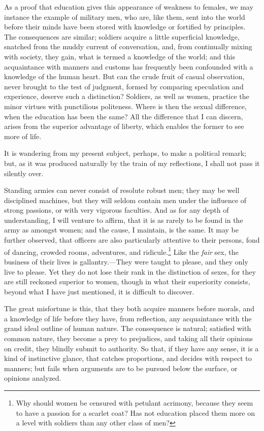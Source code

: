 As a proof that education gives this appearance of weakness to
females, we may instance the example of military men, who are, like
them, sent into the world before their minds have been stored with
knowledge or fortified by principles. The consequences are similar;
soldiers acquire a little superficial knowledge, snatched from the
muddy current of conversation, and, from continually mixing with
society, they gain, what is termed a knowledge of the world; and this
acquaintance with manners and customs has frequently been confounded
with a knowledge of the human heart. But can the crude fruit of casual
observation, never brought to the test of judgment, formed by
comparing speculation and experience, deserve such a distinction?
Soldiers, as well as women, practice the minor virtues with
punctilious politeness. Where is then the sexual difference, when the
education has been the same? All the difference that I can discern,
arises from the superior advantage of liberty, which enables the
former to see more of life.

It is wandering from my present subject,  perhaps, to make a
political remark; but, as it was produced naturally by the train of my
reflections, I shall not pass it silently over.

Standing armies can never consist of resolute robust men; they may be
well disciplined machines, but they will seldom contain men under the
influence of strong passions, or with very vigorous faculties. And as
for any depth of understanding, I will venture to affirm, that it is
as rarely to be found in the army as amongst women; and the cause, I
maintain, is the same. It may be further observed, that officers are
also particularly attentive to their persons, fond of dancing, crowded
rooms, adventures, and ridicule.\footnote{Why should women be censured
with petulant acrimony, because they seem to have a passion for a
scarlet coat? Has not education placed them more on a level with
soldiers than any other class of men?} Like the \textit{fair} sex, the
business of their lives is gallantry.---They were taught to please,
and they only live to please. Yet they do not lose their rank in the
distinction of sexes, for they are still reckoned superior to women,
though in what their superiority consists, beyond what I have just
mentioned, it is difficult to discover.

The great misfortune is this, that they  both acquire manners
before morals, and a knowledge of life before they have, from
reflection, any acquaintance with the grand ideal outline of human
nature. The consequence is natural; satisfied with common nature, they
become a prey to prejudices, and taking all their opinions on credit,
they blindly submit to authority. So that, if they have any sense, it
is a kind of instinctive glance, that catches proportions, and decides
with respect to manners; but fails when arguments are to be pursued
below the surface, or opinions analyzed.

